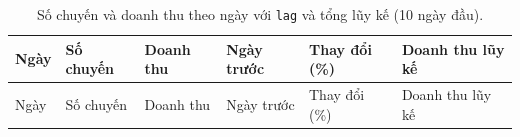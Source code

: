 \documentclass[
  12pt,
  a4paper,
]{article}
\begin{document}
\begin{longtable}[]{@{}
  >{\raggedright\arraybackslash}p{}
  >{\raggedleft\arraybackslash}p{}
  >{\raggedleft\arraybackslash}p{}
  >{\raggedleft\arraybackslash}p{}
  >{\raggedleft\arraybackslash}p{}
  >{\raggedleft\arraybackslash}p{}@{}}
\caption{\label{tbl:l05-daily}Số chuyến và doanh thu theo ngày với
\texttt{lag} và tổng lũy kế (10 ngày đầu).}\tabularnewline
\toprule\noalign{}
\begin{minipage}[b]{\linewidth}\raggedright
Ngày
\end{minipage} & \begin{minipage}[b]{\linewidth}\raggedleft
Số chuyến
\end{minipage} & \begin{minipage}[b]{\linewidth}\raggedleft
Doanh thu
\end{minipage} & \begin{minipage}[b]{\linewidth}\raggedleft
Ngày trước
\end{minipage} & \begin{minipage}[b]{\linewidth}\raggedleft
Thay đổi (\%)
\end{minipage} & \begin{minipage}[b]{\linewidth}\raggedleft
Doanh thu lũy kế
\end{minipage} \\
\midrule\noalign{}
\endfirsthead
\toprule\noalign{}
\begin{minipage}[b]{\linewidth}\raggedright
Ngày
\end{minipage} & \begin{minipage}[b]{\linewidth}\raggedleft
Số chuyến
\end{minipage} & \begin{minipage}[b]{\linewidth}\raggedleft
Doanh thu
\end{minipage} & \begin{minipage}[b]{\linewidth}\raggedleft
Ngày trước
\end{minipage} & \begin{minipage}[b]{\linewidth}\raggedleft
Thay đổi (\%)
\end{minipage} & \begin{minipage}[b]{\linewidth}\raggedleft
Doanh thu lũy kế
\end{minipage} \\

\end{longtable}
\end{document}

